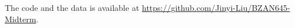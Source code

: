 \begin{APPENDIX}{}
The code and the data is available at \url{https://github.com/Jinyi-Liu/BZAN645-Midterm}.
\end{APPENDIX}